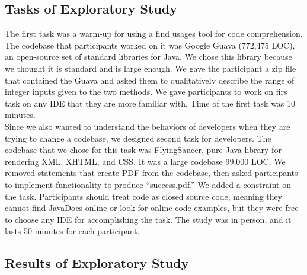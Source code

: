 \documentclass[conference]{IEEEtran}
\begin{document}
\subsection{Tasks of Exploratory Study}

The first task was a warm-up for using a find usages tool for code comprehension. The codebase that participants worked on it was Google Guava (772,475 LOC), an open-source set of standard libraries for Java. We chose this library because we thought it is standard and is large enough. We gave the participant a zip file that contained the Guava and asked them to qualitatively describe the range of integer inputs given to the two methods. We gave participants to work on firs task on any IDE that they are more familiar with. Time of the first task was 10 minutes.\\
Since we also wanted to understand the behaviors of developers when they are trying to change a codebase, we designed second task for developers. The codebase that we chose for this task was FlyingSaucer, pure Java library for rendering XML, XHTML, and CSS. It was a large codebase 99,000 LOC. We removed statements that create PDF from the codebase, then asked participants to implement functionality to produce “success.pdf.” We added a constraint on the task. Participants should treat code as closed source code, meaning they cannot find JavaDocs online or look for online code examples, but they were free to choose any IDE for accomplishing the task. The study was in person, and it lasts 50 minutes for each participant. 

\subsection{Results of Exploratory Study}

\end{document}
